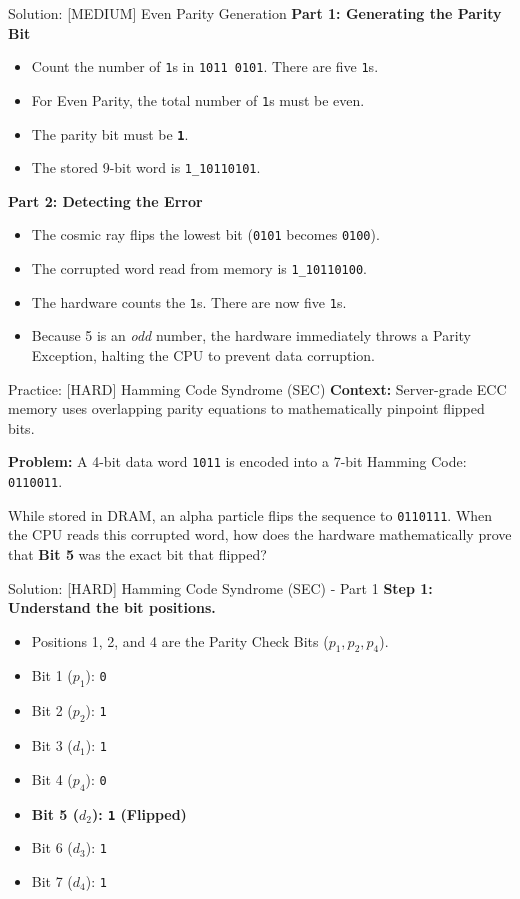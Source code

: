 \documentclass[aspectratio=169]{beamer}
\begin{document}
\begin{frame}{Solution: [MEDIUM] Even Parity Generation}
\textbf{Part 1: Generating the Parity Bit}
\begin{itemize}
    \item Count the number of \texttt{1}s in \texttt{1011 0101}. There are five \texttt{1}s.
    \item For Even Parity, the total number of \texttt{1}s must be even. 
    \item The parity bit must be \textbf{\texttt{1}}.
    \item The stored 9-bit word is \texttt{1\_10110101}.
\end{itemize}

\vspace{0.5cm}
\textbf{Part 2: Detecting the Error}
\begin{itemize}
    \item The cosmic ray flips the lowest bit (\texttt{0101} becomes \texttt{0100}).
    \item The corrupted word read from memory is \texttt{1\_10110100}.
    \item The hardware counts the \texttt{1}s. There are now five \texttt{1}s.
    \item Because 5 is an \textit{odd} number, the hardware immediately throws a Parity Exception, halting the CPU to prevent data corruption.
\end{itemize}
\end{frame}

\begin{frame}{Practice: [HARD] Hamming Code Syndrome (SEC)}
\textbf{Context:} Server-grade ECC memory uses overlapping parity equations to mathematically pinpoint flipped bits.

\vspace{0.5cm}
\textbf{Problem:} 
A 4-bit data word \texttt{1011} is encoded into a 7-bit Hamming Code: \texttt{0110011}. 

While stored in DRAM, an alpha particle flips the sequence to \texttt{0110111}. When the CPU reads this corrupted word, how does the hardware mathematically prove that \textbf{Bit 5} was the exact bit that flipped?
\end{frame}

\begin{frame}{Solution: [HARD] Hamming Code Syndrome (SEC) - Part 1}
\textbf{Step 1: Understand the bit positions.}
\begin{itemize}
    \item Positions 1, 2, and 4 are the Parity Check Bits ($p_1, p_2, p_4$).
    \item Bit 1 ($p_1$): \texttt{0}
    \item Bit 2 ($p_2$): \texttt{1}
    \item Bit 3 ($d_1$): \texttt{1}
    \item Bit 4 ($p_4$): \texttt{0}
    \item \textbf{Bit 5 ($d_2$): \texttt{1} (Flipped)}
    \item Bit 6 ($d_3$): \texttt{1}
    \item Bit 7 ($d_4$): \texttt{1}
\end{itemize}
\end{frame}
\end{document}
